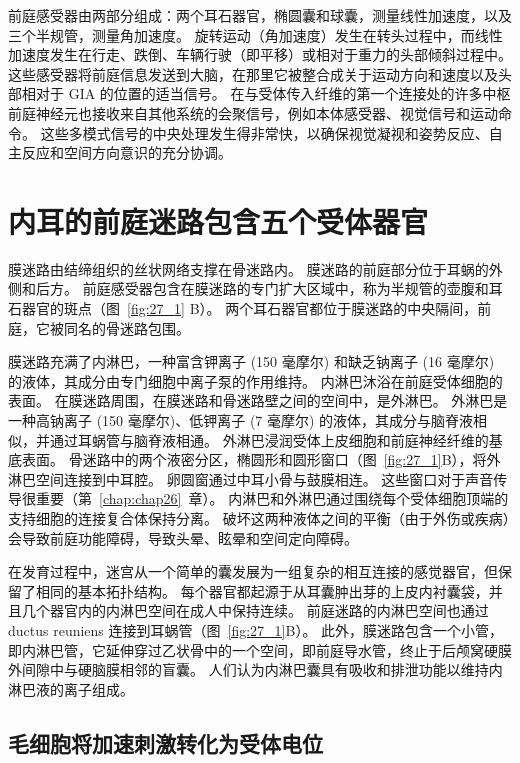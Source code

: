 前庭感受器由两部分组成：两个耳石器官，椭圆囊和球囊，测量线性加速度，以及三个半规管，测量角加速度。
旋转运动（角加速度）发生在转头过程中，而线性加速度发生在行走、跌倒、车辆行驶（即平移）或相对于重力的头部倾斜过程中。
这些感受器将前庭信息发送到大脑，在那里它被整合成关于运动方向和速度以及头部相对于 GIA 的位置的适当信号。
在与受体传入纤维的第一个连接处的许多中枢前庭神经元也接收来自其他系统的会聚信号，例如本体感受器、视觉信号和运动命令。
这些多模式信号的中央处理发生得非常快，以确保视觉凝视和姿势反应、自主反应和空间方向意识的充分协调。



\section{内耳的前庭迷路包含五个受体器官}

膜迷路由结缔组织的丝状网络支撑在骨迷路内。
膜迷路的前庭部分位于耳蜗的外侧和后方。
前庭感受器包含在膜迷路的专门扩大区域中，称为半规管的壶腹和耳石器官的斑点（图~\ref{fig:27_1} B）。
两个耳石器官都位于膜迷路的中央隔间，前庭，它被同名的骨迷路包围。


膜迷路充满了内淋巴，一种富含钾离子 (150 毫摩尔) 和缺乏钠离子 (16 毫摩尔) 的液体，其成分由专门细胞中离子泵的作用维持。
内淋巴沐浴在前庭受体细胞的表面。
在膜迷路周围，在膜迷路和骨迷路壁之间的空间中，是外淋巴。
外淋巴是一种高钠离子 (150 毫摩尔)、低钾离子 (7 毫摩尔) 的液体，其成分与脑脊液相似，并通过耳蜗管与脑脊液相通。
外淋巴浸润受体上皮细胞和前庭神经纤维的基底表面。 骨迷路中的两个液密分区，椭圆形和圆形窗口（图~\ref{fig:27_1}B），将外淋巴空间连接到中耳腔。 卵圆窗通过中耳小骨与鼓膜相连。
这些窗口对于声音传导很重要（第~\ref{chap:chap26}~章）。
内淋巴和外淋巴通过围绕每个受体细胞顶端的支持细胞的连接复合体保持分离。
破坏这两种液体之间的平衡（由于外伤或疾病）会导致前庭功能障碍，导致头晕、眩晕和空间定向障碍。


在发育过程中，迷宫从一个简单的囊发展为一组复杂的相互连接的感觉器官，但保留了相同的基本拓扑结构。
每个器官都起源于从耳囊肿出芽的上皮内衬囊袋，并且几个器官内的内淋巴空间在成人中保持连续。
前庭迷路的内淋巴空间也通过 ductus reuniens 连接到耳蜗管（图~\ref{fig:27_1}B）。
此外，膜迷路包含一个小管，即内淋巴管，它延伸穿过乙状骨中的一个空间，即前庭导水管，终止于后颅窝硬膜外间隙中与硬脑膜相邻的盲囊。
人们认为内淋巴囊具有吸收和排泄功能以维持内淋巴液的离子组成。



\subsection{毛细胞将加速刺激转化为受体电位}

